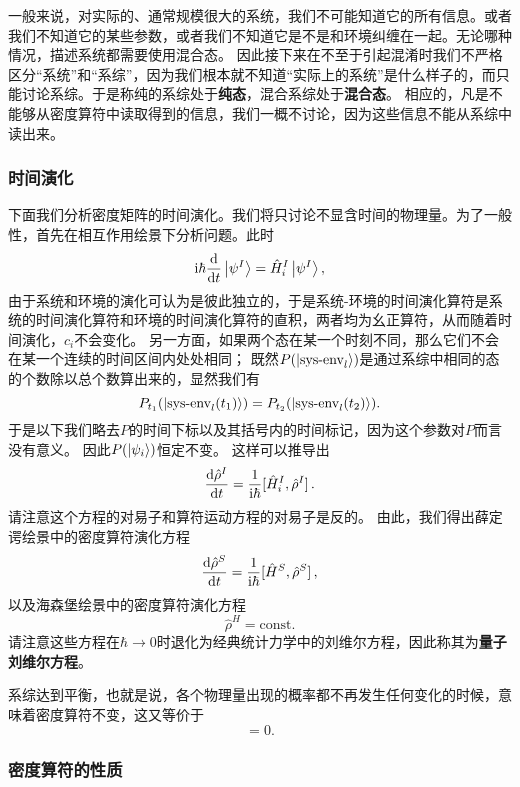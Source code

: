 \documentclass[hyperref, UTF8, a4paper]{ctexart}
\newcommand*{\ii}{\mathrm{i}}
\newcommand*{\const}{\mathrm{const}}
\begin{document}
一般来说，对实际的、通常规模很大的系统，我们不可能知道它的所有信息。或者我们不知道它的某些参数，或者我们不知道它是不是和环境纠缠在一起。无论哪种情况，描述系统都需要使用混合态。
因此接下来在不至于引起混淆时我们不严格区分“系统”和“系综”，因为我们根本就不知道“实际上的系统”是什么样子的，而只能讨论系综。于是称纯的系综处于\textbf{纯态}，混合系综处于\textbf{混合态}。
相应的，凡是不能够从密度算符中读取得到的信息，我们一概不讨论，因为这些信息不能从系综中读出来。

\subsubsection{时间演化}

下面我们分析密度矩阵的时间演化。我们将只讨论不显含时间的物理量。为了一般性，首先在相互作用绘景下分析问题。此时
\[
    \ii \hbar \dv{t} \ket{\psi^I} = \hat{H}_i^I \ket{\psi^I},
\]
由于系统和环境的演化可认为是彼此独立的，于是系统-环境的时间演化算符是系统的时间演化算符和环境的时间演化算符的直积，两者均为幺正算符，从而随着时间演化，$c_i$不会变化。
另一方面，如果两个态在某一个时刻不同，那么它们不会在某一个连续的时间区间内处处相同；
既然$P(\ket{\text{sys-env}_l})$是通过系综中相同的态的个数除以总个数算出来的，显然我们有
\[
    P_{t_1} (\ket{\text{sys-env}_l (t_1)}) = P_{t_2} (\ket{\text{sys-env}_l (t_2)}).
\]
于是以下我们略去$P$的时间下标以及其括号内的时间标记，因为这个参数对$P$而言没有意义。
因此$P(\ket{\psi_i})$恒定不变。
这样可以推导出
\begin{equation}
    \dv{\hat{\rho}^I}{t} = \frac{1}{\ii \hbar} \comm*{\hat{H}_i^I}{\hat{\rho}^I}.
\end{equation}
请注意这个方程的对易子和算符运动方程的对易子是反的。
由此，我们得出薛定谔绘景中的密度算符演化方程
\begin{equation}
    \dv{\hat{\rho}^S}{t} = \frac{1}{\ii \hbar} \comm*{\hat{H}^S}{\hat{\rho}^S},
\end{equation}
以及海森堡绘景中的密度算符演化方程
\begin{equation}
    \hat{\rho}^H = \const.
\end{equation}
请注意这些方程在$\hbar \to 0$时退化为经典统计力学中的刘维尔方程，因此称其为\textbf{量子刘维尔方程}。

系综达到平衡，也就是说，各个物理量出现的概率都不再发生任何变化的时候，意味着密度算符不变，这又等价于
\begin{equation}
    [\hat{\rho}, \hat{H}] = 0.
    \label{eq:equilibrium-case}
\end{equation}

\subsubsection{密度算符的性质}
\end{document}
